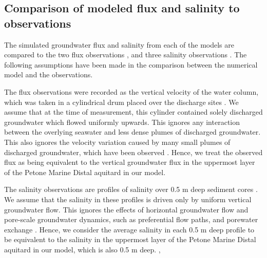 \documentclass[draft, 10pt]{agujournal2019}
\begin{document}
\subsection{Comparison of modeled flux and salinity to observations}
The simulated groundwater flux and salinity from each of the models are compared to the two flux observations \cite{harding_characteristics_2000}, and three salinity observations \cite{hoffmann_fresh_2023}. The following assumptions have been made in the comparison between the numerical model and the observations.

The flux observations were recorded as the vertical velocity of the water column, which was taken in a cylindrical drum placed over the discharge sites \cite{harding_characteristics_2000}. We assume that at the time of measurement, this cylinder contained solely discharged groundwater which flowed uniformly upwards. This ignores any interaction between the overlying seawater and less dense plumes of discharged groundwater. This also ignores the velocity variation caused by many small plumes of discharged groundwater, which have been observed \cite{harding_characteristics_2000}. Hence, we treat the observed flux as being equivalent to the vertical groundwater flux in the uppermost layer of the Petone Marine Distal aquitard in our model.

The salinity observations are profiles of salinity over 0.5 m deep sediment cores \cite{hoffmann_fresh_2023}. We assume that the salinity in these profiles is driven only by uniform vertical groundwater flow. This ignores the effects of horizontal groundwater flow and pore-scale groundwater dynamics, such as preferential flow paths, and porewater exchange \cite{taniguchi_submarine_2019}. Hence, we consider the average salinity in each 0.5 m deep profile to be equivalent to the salinity in the uppermost layer of the Petone Marine Distal aquitard in our model, which is also 0.5 m deep. , 
\end{document}
